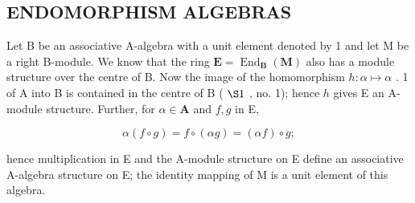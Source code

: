 \subsection{ENDOMORPHISM ALGEBRAS}

Let B be an associative A-algebra with a unit element denoted by 1 and let M be a right B-module. We know that the ring \(\mathbf{E} = \operatorname{End}_{\mathbf{B}}(\mathbf{M})\) also has a module structure over the centre of B. Now the image of the homomorphism \(h: \alpha \mapsto \alpha\) . 1 of A into B is contained in the centre of B ( \(\S 1\) , no. 1); hence \(h\) gives E an A-module structure. Further, for \(\alpha \in \mathbf{A}\) and \(f, g\) in E,

\[
\alpha (f \circ g) = f \circ (\alpha g) = (\alpha f) \circ g;
\]

hence multiplication in E and the A-module structure on E define an associative A-algebra structure on E; the identity mapping of M is a unit element of this algebra.

